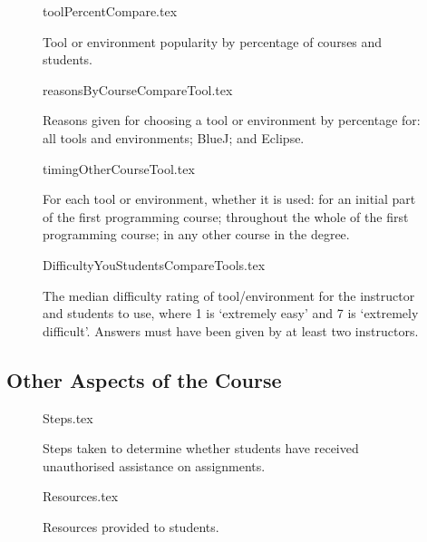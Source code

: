 \documentclass{sig-alternate}
\begin{document}
\begin{figure}
\begin{center}
{toolPercentCompare.tex}
\caption{Tool or environment popularity by percentage of courses and students.\label{fig:tools}}
\end{center}
\end{figure}

\begin{figure}
\begin{center}
{reasonsByCourseCompareTool.tex}
\end{center}
\caption{Reasons given for choosing a tool or environment by percentage for: all tools and environments; BlueJ; and Eclipse.}
\end{figure}

\begin{figure}
\begin{center}
{timingOtherCourseTool.tex}
\end{center}\vskip-18pt
\caption{For each tool or environment, whether it is used: for an initial part of the first programming course; throughout the whole of the first programming course; in any other course in the degree.\label{fig:toolreuse}}
\end{figure}


\begin{figure}
\begin{center}
{DifficultyYouStudentsCompareTools.tex}
\end{center}
\caption{The median difficulty rating of tool/environment for the instructor and students to use, where 1 is `extremely easy' and 7 is `extremely difficult'.  Answers must have been given by at least two instructors.\label{fig:toolhard}}
\end{figure}

\subsection{Other Aspects of the Course}

\begin{figure}
\begin{center}
{Steps.tex}
\end{center}\vskip-18pt
\caption{Steps taken to determine whether students have received unauthorised assistance on assignments.}
\end{figure}

\begin{figure}
\begin{center}
{Resources.tex}
\end{center}\vskip-18pt
\caption{Resources provided to students.}
\end{figure}
\end{document}
